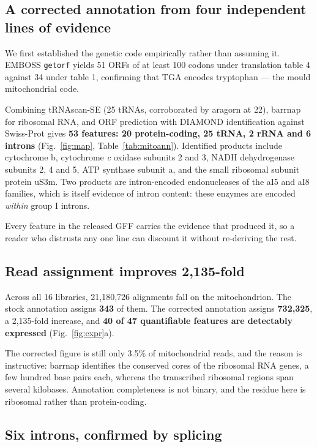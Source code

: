 \subsection{A corrected annotation from four independent lines of evidence}

We first established the genetic code empirically rather than assuming it. EMBOSS
\texttt{getorf} yields 51 ORFs of at least 100 codons under translation table 4 against 34
under table 1, confirming that TGA encodes tryptophan --- the mould mitochondrial code.

Combining tRNAscan-SE (25 tRNAs, corroborated by aragorn at 22), barrnap for ribosomal RNA, and
ORF prediction with DIAMOND identification against Swiss-Prot gives \textbf{53 features: 20
protein-coding, 25 tRNA, 2 rRNA and 6 introns} (Fig.~\ref{fig:map}, Table~\ref{tab:mitoann}).
Identified products include cytochrome b, cytochrome \textit{c} oxidase subunits 2 and 3, NADH
dehydrogenase subunits 2, 4 and 5, ATP synthase subunit a, and the small ribosomal subunit
protein uS3m. Two products are intron-encoded endonucleases of the aI5 and aI8 families, which
is itself evidence of intron content: these enzymes are encoded \textit{within} group I introns.

Every feature in the released GFF carries the evidence that produced it, so a reader who
distrusts any one line can discount it without re-deriving the rest.

\subsection{Read assignment improves 2{,}135-fold}

Across all 16 libraries, 21,180,726 alignments fall on the mitochondrion. The stock annotation
assigns \textbf{343} of them. The corrected annotation assigns \textbf{732,325}, a 2,135-fold
increase, and \textbf{40 of 47 quantifiable features are detectably expressed}
(Fig.~\ref{fig:expr}a).

The corrected figure is still only 3.5\% of mitochondrial reads, and the reason is instructive:
barrnap identifies the conserved cores of the ribosomal RNA genes, a few hundred base pairs
each, whereas the transcribed ribosomal regions span several kilobases. Annotation completeness
is not binary, and the residue here is ribosomal rather than protein-coding.

\subsection{Six introns, confirmed by splicing}


